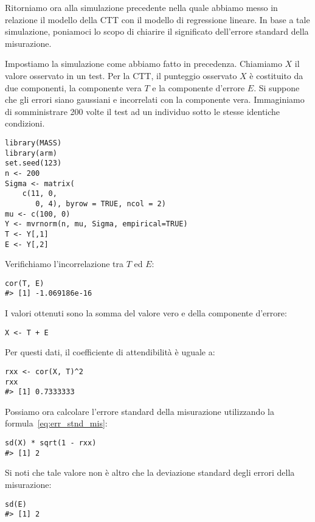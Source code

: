 Ritorniamo ora alla simulazione precedente nella quale abbiamo messo in relazione il modello della CTT con il modello di regressione lineare.
In base a tale simulazione, poniamoci lo scopo di chiarire il significato dell'errore standard della misurazione.

Impostiamo la simulazione come abbiamo fatto in precedenza.
Chiamiamo $X$ il valore osservato in un test. 
Per la CTT, il punteggio osservato $X$ è costituito da due componenti, la componente vera $T$ e la componente d'errore $E$. 
Si suppone che gli errori siano gaussiani e incorrelati con la componente vera.  
Immaginiamo di somministrare 200 volte il test ad un individuo sotto le stesse identiche condizioni.
\begin{lstlisting} 
library(MASS)
library(arm)
set.seed(123)
n <- 200
Sigma <- matrix(
    c(11, 0, 
       0, 4), byrow = TRUE, ncol = 2)
mu <- c(100, 0)
Y <- mvrnorm(n, mu, Sigma, empirical=TRUE)
T <- Y[,1]
E <- Y[,2]
\end{lstlisting} 
Verifichiamo l'incorrelazione tra $T$ ed $E$:
\begin{lstlisting} 
cor(T, E)
#> [1] -1.069186e-16
\end{lstlisting} 
I valori ottenuti sono la somma del valore vero e della componente d'errore:
\begin{lstlisting} 
X <- T + E
\end{lstlisting} 
Per questi dati, il coefficiente di attendibilità è uguale a:
\begin{lstlisting} 
rxx <- cor(X, T)^2
rxx
#> [1] 0.7333333
\end{lstlisting} 
Possiamo ora calcolare l'errore standard della misurazione utilizzando la formula~\ref{eq:err_stnd_mis}:
\begin{lstlisting} 
sd(X) * sqrt(1 - rxx)
#> [1] 2
\end{lstlisting} 
Si noti che tale valore non è altro che la deviazione standard degli errori della misurazione:
\begin{lstlisting} 
sd(E)
#> [1] 2
\end{lstlisting} 
